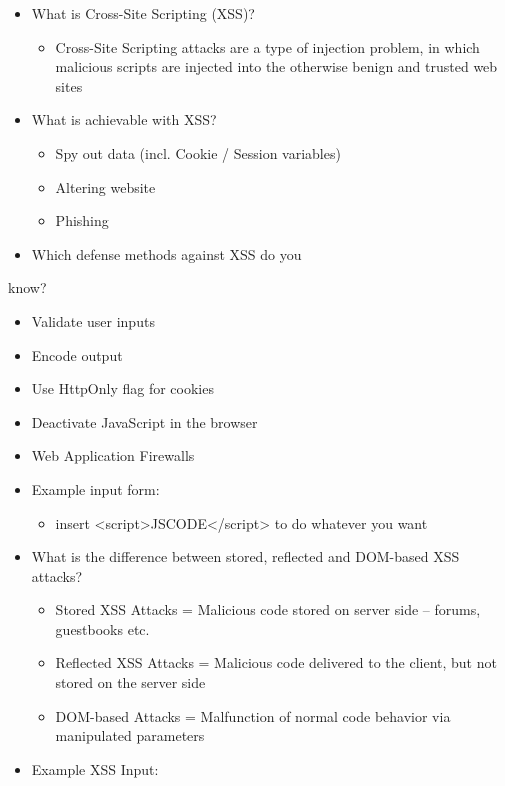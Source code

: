 \documentclass[11pt]{article}
\begin{document}
\begin{itemize}
\item What is Cross-Site Scripting (XSS)?
\begin{itemize}
\item Cross-Site Scripting attacks are a type of injection problem, in which malicious scripts are injected into the otherwise benign and trusted web sites
\end{itemize}
\item What is achievable with XSS?
\begin{itemize}
\item Spy out data (incl. Cookie / Session variables)
\item Altering website
\item Phishing
\end{itemize}
\item Which defense methods against XSS do you
\end{itemize}
know?
\begin{itemize}
\item Validate user inputs
\item Encode output
\item Use HttpOnly flag for cookies
\item Deactivate JavaScript in the browser
\item Web Application Firewalls
\end{itemize}
\begin{itemize}
\item Example input form:
\begin{itemize}
\item insert <script>JSCODE</script> to do whatever you want
\end{itemize}
\item What is the difference between stored, reflected and DOM-based XSS attacks?
\begin{itemize}
\item Stored XSS Attacks = Malicious code stored on server side – forums, guestbooks etc.
\item Reflected XSS Attacks = Malicious code delivered to the client, but not stored on the server side
\item DOM-based Attacks = Malfunction of normal code behavior via manipulated parameters
\end{itemize}
\item Example XSS Input:
\end{itemize}
\lstset{breaklines=true,language=javascript,label= ,caption= ,captionpos=b,numbers=none}
\end{document}
